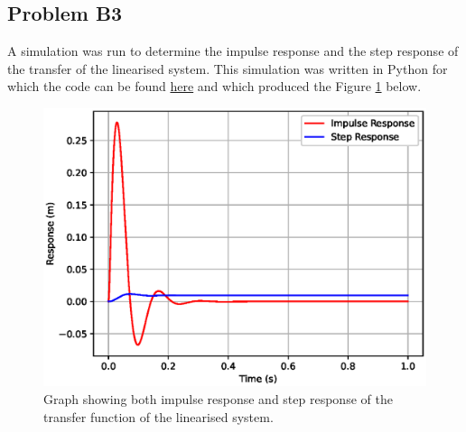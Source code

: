 \subsection*{Problem B3}
    A simulation was run to determine the impulse response and the step response of the transfer of the linearised system. This simulation was written in Python for which the code can be found \href{https://github.com/drlim2u/ELE2024-Control-Coursework/blob/059953dc7b2d8ba0a86b6f437153ceb4442b7a60/PartB.py#L59}{here} and which produced the Figure \ref{fig:problem_b3} below.
    \begin{figure}[H]
        \centering
        \includegraphics[width=0.6\linewidth]{figures/problem_b3.eps}
        \caption{Graph showing both impulse response and step response of the transfer function of the linearised system.}
        \label{fig:problem_b3}
    \end{figure}

  